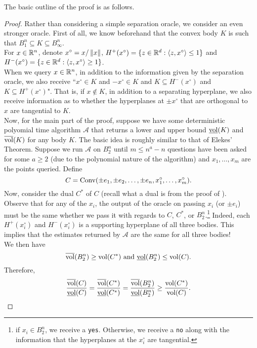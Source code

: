 The basic outline of the proof is as follows.\\

\begin{proof}
Rather than considering a simple separation oracle, we consider an even stronger oracle. First of all, we know beforehand that the convex body $K$ is such that $B_1^n\subseteq K\subseteq B_\infty^n$.\\
For $x\in\mathbb{R}^n$, denote $x^\circ = x/\left\lVert x\right\rVert$, $H^+(x^\circ) = \{ z\in\mathbb{R}^d:\langle z,x^\circ \rangle \leq 1 \}$ and $H^-(x^\circ) = \{ z\in\mathbb{R}^d:\langle z,x^\circ \rangle \geq 1 \}$.\\

When we query $x\in\mathbb{R}^n$, in addition to the information given by the separation oracle, we also receive ``$x^\circ\in K$ and $-x^\circ\in K$ and $K\subseteq H^-(x^\circ)$ and $K\subseteq H^+(x^\circ)$". That is, if $x\not\in K$, in addition to a separating hyperplane, we also receive information as to whether the hyperplanes at $\pm x^\circ$ that are orthogonal to $x$ are tangential to $K$.\\

Now, for the main part of the proof, suppose we have some deterministic polyomial time algorithm $\mathcal{A}$ that returns a lower and upper bound $\underline{\operatorname{vol}}(K)$ and $\overline{\operatorname{vol}}(K)$ for any body $K$. The basic idea is roughly similar to that of Elekes' Theorem. Suppose we run $\mathcal{A}$ on $B_2^n$ until $m\leq n^a - n$ questions have been asked for some $a\geq 2$ (due to the polynomial nature of the algorithm) and $x_1,\ldots,x_m$ are the points queried. Define
\[ C = \operatorname{Conv}(\pm e_1, \pm e_2, \ldots, \pm e_n, x_1^\circ, \ldots, x_m^\circ). \]
Now, consider the dual $C^*$ of $C$ (recall what a dual is from the proof of ). Observe that for any of the $x_i$, the output of the oracle on passing $x_i$ (or $\pm e_i$) must be the same whether we pass it with regards to $C$, $C^*$, or $B_2^n$.\footnote{if $x_i\in B_2^n$, we receive a \texttt{yes}. Otherwise, we receive a \texttt{no} along with the information that the hyperplanes at the $x_i^\circ$ are tangential.} Indeed, each $H^+(x_i^\circ)$ and $H^-(x_i^\circ)$ is a supporting hyperplane of all three bodies. This implies that the estimates returned by $\mathcal{A}$ are the same for all three bodies!\\
We then have
\[ \overline{\operatorname{vol}}(B_2^n) \geq \operatorname{vol}(C^*)\text{ and }\underline{\operatorname{vol}}(B_2^n) \leq \operatorname{vol}(C). \]
Therefore,
\[ \frac{\overline{\operatorname{vol}}(C)}{\underline{\operatorname{vol}}(C)} = \frac{\overline{\operatorname{vol}}(C^*)}{\underline{\operatorname{vol}}(C^*)} = \frac{\overline{\operatorname{vol}}(B_2^n)}{\underline{\operatorname{vol}}(B_2^n)} \geq \frac{\operatorname{vol}(C^*)}{\operatorname{vol}(C)}. \]
\end{proof}

